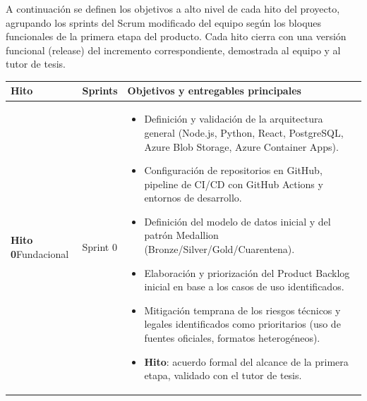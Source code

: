\documentclass[11pt,a4paper]{article}
\begin{document}
A continuaci\'on se definen los objetivos a alto nivel de cada hito del proyecto, agrupando los sprints del Scrum modificado del equipo seg\'un los bloques funcionales de la primera etapa del producto. Cada hito cierra con una versi\'on funcional (release) del incremento correspondiente, demostrada al equipo y al tutor de tesis.

\renewcommand{\arraystretch}{1.2}
\begin{longtable}{@{}>{\raggedright\arraybackslash}p{2.6cm} >{\raggedright\arraybackslash}p{2cm} >{\raggedright\arraybackslash}p{\dimexpr\textwidth-2.6cm-2cm-6\tabcolsep\relax}@{}}
\toprule
\textbf{Hito} & \textbf{Sprints} & \textbf{Objetivos y entregables principales} \\
\midrule
\endhead
\bottomrule
\endfoot

\textbf{Hito 0}\newline Fundacional & Sprint 0 &
\begin{itemize}[leftmargin=1em]
  \item Definici\'on y validaci\'on de la arquitectura general (Node.js, Python, React, PostgreSQL, Azure Blob Storage, Azure Container Apps).
  \item Configuraci\'on de repositorios en GitHub, pipeline de CI/CD con GitHub Actions y entornos de desarrollo.
  \item Definici\'on del modelo de datos inicial y del patr\'on Medallion (Bronze/Silver/Gold/Cuarentena).
  \item Elaboraci\'on y priorizaci\'on del Product Backlog inicial en base a los casos de uso identificados.
  \item Mitigaci\'on temprana de los riesgos t\'ecnicos y legales identificados como prioritarios (uso de fuentes oficiales, formatos heterog\'eneos).
  \item \textbf{Hito}: acuerdo formal del alcance de la primera etapa, validado con el tutor de tesis.
\end{itemize} \\
\midrule


\end{longtable}
\end{document}
